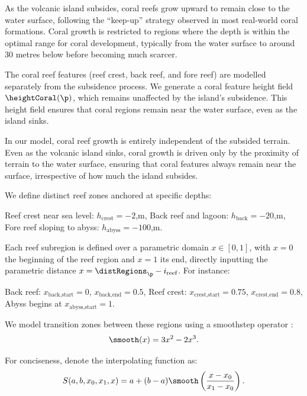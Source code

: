 As the volcanic island subsides, coral reefs grow upward to remain close to the water surface, following the “keep-up” strategy observed in most real-world coral formations. Coral growth is restricted to regions where the depth is within the optimal range for coral development, typically from the water surface to around 30 metres below before becoming much scarcer.

The coral reef features (reef crest, back reef, and fore reef) are modelled separately from the subsidence process. We generate a coral feature height field $\heightCoral(\p)$, which remains unaffected by the island's subsidence. This height field ensures that coral regions remain near the water surface, even as the island sinks.

In our model, coral reef growth is entirely independent of the subsided terrain. Even as the volcanic island sinks, coral growth is driven only by the proximity of terrain to the water surface, ensuring that coral features always remain near the surface, irrespective of how much the island subsides.

We define distinct reef zones anchored at specific depths:
\begin{Itemize}
    \Item{} Reef crest near sea level: $h_\text{crest} = -2$,m,
    \Item{} Back reef and lagoon: $h_\text{back} = -20$,m,
    \Item{} Fore reef sloping to abyss: $h_\text{abyss} = -100$,m.
\end{Itemize}

Each reef subregion is defined over a parametric domain $x \in [0, 1]$, with $x=0$ the beginning of the reef region and $x=1$ its end, directly inputting the parametric distance $x = \distRegions_\p - i_{\text{reef}}$. For instance:
\begin{Itemize}
    \Item{} Back reef: $x_{\text{back,start}} = 0$, $x_{\text{back,end}} = 0.5$,
    \Item{} Reef crest: $x_{\text{crest,start}} = 0.75$, $x_{\text{crest,end}} = 0.8$,
    \Item{} Abyss begins at $x_{\text{abyss,start}} = 1$.
\end{Itemize}

We model transition zones between these regions using a smoothstep operator \cite{Perlin2002}:
\begin{align}
    \smooth(x) = 3x^2 - 2x^3.
\end{align}

For conciseness, denote the interpolating function as:
\begin{align}
    S(a, b, x_0, x_1, x) = a + (b-a) \smooth\left(\frac{x - x_0}{x_1 - x_0}\right).
\end{align}

